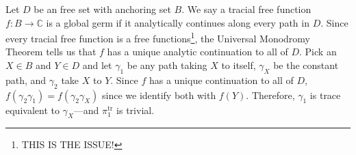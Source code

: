 \documentclass[11pt]{exam}
\newcommand{\CC}{\mathbb{C}}
\begin{document}
Let $D$ be an free set with anchoring set $B$. We say a tracial free function
$f: B \to \CC $ is a global germ if it analytically continues along every path
in $D$. Since every tracial free function is a free functions\footnote{THIS IS
  THE ISSUE!},  the
Universal Monodromy Theorem tells us that $f$ has a unique analytic
continuation to all of $D$. Pick an $X \in B$ and $Y \in D$ and
let $\gamma_1$ be any path taking $X$ to itself, $\gamma_X$ be the constant
path, and $\gamma_2$ take $X$ to  $Y$. Since $f$ has a unique continuation to all of $D$,
$f(\gamma_2\gamma_1) = f(\gamma_2\gamma_X)$ since we identify both with $f(Y)$.
Therefore, $\gamma_1$ is trace equivalent to $\gamma_X$---and
$\pi_1^{\text{tr} }$ is trivial.
\end{document}
